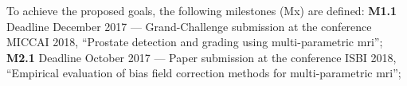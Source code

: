 To achieve the proposed goals, the following milestones (Mx) are defined:
\textbf{M1.1} Deadline December 2017 --- Grand-Challenge submission at the conference MICCAI 2018, ``Prostate detection and grading using multi-parametric \ac{mri}'';
\textbf{M2.1} Deadline October 2017 --- Paper submission at the conference ISBI 2018, ``Empirical evaluation of bias field correction methods for multi-parametric \ac{mri}'';
